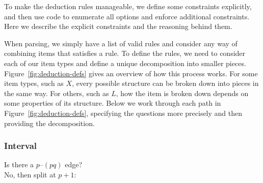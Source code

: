 To make the deduction rules manageable, we define some constraints explicitly, and then use code to enumerate all options and enforce additional constraints.
Here we describe the explicit constraints and the reasoning behind them.

When parsing, we simply have a list of valid rules and consider any way of combining items that satisfies a rule.
To define the rules, we need to consider each of our item types and define a unique decomposition into smaller pieces.
Figure~\ref{fig:deduction-defs} gives an overview of how this process works.
For some item types, such as $X$, every possible structure can be broken down into pieces in the same way.
For others, such as $L$, how the item is broken down depends on some properties of its structure.
Below we work through each path in Figure~\ref{fig:deduction-defs}, specifying the questions more precisely and then providing the decomposition.

\subsubsection{Interval}\label{sec:interval}
Is there a $p$--$(pq)$ edge? \\
No, then split at $p+1$: \\

\noindent
\begin{minipage}{\deductionRuleLength}
\centering
\hfill{}\hfill
{}
\end{minipage}
\vspace{5mm}

